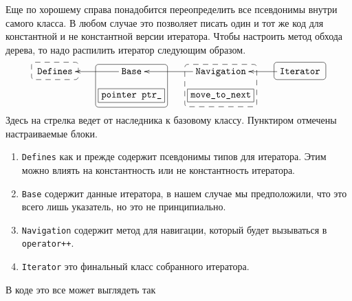 Еще по хорошему справа понадобится переопределить все псевдонимы внутри самого класса.
В любом случае это позволяет писать один и тот же код для константной и не константной версии итератора.
Чтобы настроить метод обхода дерева, то надо распилить итератор следующим образом.
\[
\xymatrix@R=10pt{
  {\texttt{Defines}}
     	{\save
   [].[]*+[F--:<3pt>]\frm{}
   \restore
	}
  &{\texttt{Base}}\ar[l]
     	{\save
   [].[d]*+[F-:<3pt>]\frm{}
   \restore
	}
  &{\texttt{Navigation}}\ar[l]
     	{\save
   [].[d]*+[F--:<3pt>]\frm{}
   \restore
	}
  &{\texttt{Iterator}}\ar[l]
     	{\save
   [].[]*+[F-:<3pt>]\frm{}
   \restore
	}
  \\
  {}&{\texttt{pointer ptr\_}}
       	{\save
   [].[]*[F-]\frm{}
   \restore
	}
  &{\texttt{move\_to\_next}}
         	{\save
   [].[]*[F-]\frm{}
   \restore
	}
  &{}\\
}
\]
Здесь на стрелка ведет от наследника к базовому классу.
Пунктиром отмечены настраиваемые блоки.
\begin{enumerate}
\item \texttt{Defines} как и прежде содержит псевдонимы типов для итератора.
Этим можно влиять на константность или не константность итератора.

\item \texttt{Base} содержит данные итератора, в нашем случае мы предположили, что это всего лишь указатель, но это не принципиально.

\item \texttt{Navigation} содержит метод для навигации, который будет вызываться в \verb"operator++".

\item \texttt{Iterator} это финальный класс собранного итератора.
\end{enumerate}
В коде это все может выглядеть так
